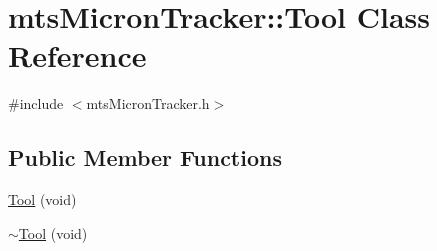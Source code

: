 \hypertarget{classmts_micron_tracker_1_1_tool}{}\section{mts\+Micron\+Tracker\+:\+:Tool Class Reference}
\label{classmts_micron_tracker_1_1_tool}


{\ttfamily \#include $<$mts\+Micron\+Tracker.\+h$>$}

\subsection*{Public Member Functions}
\begin{DoxyCompactItemize}
\item 
\hyperlink{classmts_micron_tracker_1_1_tool_a4a406799195f7c0ff15a7970aa6bf9dd}{Tool} (void)
\item 
\hyperlink{classmts_micron_tracker_1_1_tool_a3c2b24ccc1b4a8f5e678810b7040c417}{$\sim$\+Tool} (void)
\end{DoxyCompactItemize}
